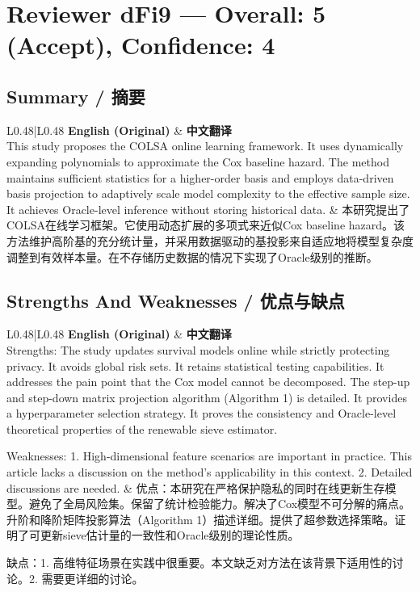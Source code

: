 \documentclass[10pt,a4paper]{article}
\begin{document}
\newpage
\section{Reviewer dFi9 --- Overall: 5 (Accept), Confidence: 4}

\subsection{Summary / 摘要}

\begin{longtable}{L{0.48\textwidth}|L{0.48\textwidth}}
\hline
\textbf{English (Original)} & \textbf{中文翻译} \\
\hline
This study proposes the COLSA online learning framework. It uses dynamically expanding polynomials to approximate the Cox baseline hazard. The method maintains sufficient statistics for a higher-order basis and employs data-driven basis projection to adaptively scale model complexity to the effective sample size. It achieves Oracle-level inference without storing historical data.
&
本研究提出了COLSA在线学习框架。它使用动态扩展的多项式来近似Cox baseline hazard。该方法维护高阶基的充分统计量，并采用数据驱动的基投影来自适应地将模型复杂度调整到有效样本量。在不存储历史数据的情况下实现了Oracle级别的推断。 \\
\hline
\end{longtable}

\subsection{Strengths And Weaknesses / 优点与缺点}

\begin{longtable}{L{0.48\textwidth}|L{0.48\textwidth}}
\hline
\textbf{English (Original)} & \textbf{中文翻译} \\
\hline
Strengths: The study updates survival models online while strictly protecting privacy. It avoids global risk sets. It retains statistical testing capabilities. It addresses the pain point that the Cox model cannot be decomposed. The step-up and step-down matrix projection algorithm (Algorithm 1) is detailed. It provides a hyperparameter selection strategy. It proves the consistency and Oracle-level theoretical properties of the renewable sieve estimator.

Weaknesses: 1. High-dimensional feature scenarios are important in practice. This article lacks a discussion on the method's applicability in this context. 2. Detailed discussions are needed.
&
优点：本研究在严格保护隐私的同时在线更新生存模型。避免了全局风险集。保留了统计检验能力。解决了Cox模型不可分解的痛点。升阶和降阶矩阵投影算法（Algorithm 1）描述详细。提供了超参数选择策略。证明了可更新sieve估计量的一致性和Oracle级别的理论性质。

缺点：1. 高维特征场景在实践中很重要。本文缺乏对方法在该背景下适用性的讨论。2. 需要更详细的讨论。 \\
\hline
\end{longtable}
\end{document}
